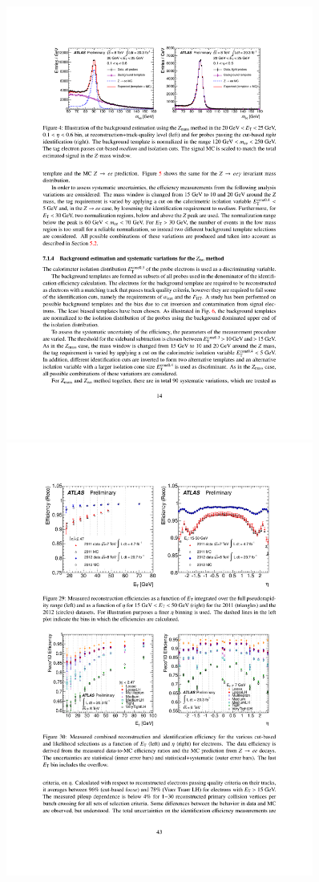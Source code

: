 \begin{figure}[tp]
  \centering
  \includegraphics[width=0.90\textwidth]{figures/performance/electron-ZeeTP}
  \includegraphics[width=0.90\textwidth]{figures/performance/electron-recoIDefficiecy}

\end{figure}
